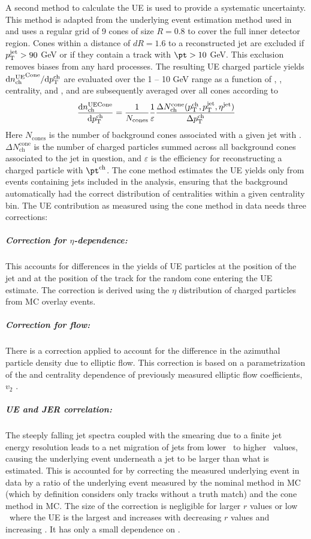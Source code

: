 A second method to calculate the UE is used to provide a systematic uncertainty. This method is adapted from the underlying event estimation method used in \cite{PhysRevC.98.024908} and uses a regular grid of 9 cones of size $R = 0.8$ to cover the full inner detector region. Cones within a distance of $dR=1.6$ to a reconstructed jet are excluded if $\mbox{$p_{\mathrm{T}}^{\mathrm{jet}}$} > 90$ GeV or if they contain a track with $\pt > 10$ GeV. This exclusion removes biases from any hard processes. The resulting UE charged particle yields $\mathrm{d} \mbox{$n_{\mathrm{ch}}^{\mathrm{UE}}$}^{\mathrm{Cone}}/ \mathrm{d} \mbox{$p_{{\mathrm{T}}}^{\mathrm{ch}}$}$ are evaluated over the 1 -- 10 GeV range as a function of \pt, \ptjet, centrality, and \rvar, and are subsequently averaged over all cones according to
 \begin{eqnarray}
 \label{eq:Dptsub}
\frac{\mathrm{d} n_{\mathrm{ch}}^{\mathrm{UE Cone}}}{\mathrm{d} \mbox{$p_{{\mathrm{T}}}^{\mathrm{ch}}$}}  = \frac{1}{N_{\mathrm{cones}}} \frac{1}{\varepsilon} \frac{\Delta N^{\mathrm{cone}}_{\mathrm{ch}} (\mbox{$p_{{\mathrm{T}}}^{\mathrm{ch}}$}, \mbox{$p_{\mathrm{T}}^{\mathrm{jet}}$}, \mbox{$\eta^{\mathrm{jet}}$})}{\Delta \mbox{$p_{{\mathrm{T}}}^{\mathrm{ch}}$}}
 \end{eqnarray}
 Here $N_{\mathrm{cones}}$ is the number of background cones associated with a given jet with \ptjet. $\Delta N^{\mathrm{cone}}_{\mathrm{ch}}$ is the number of charged particles summed across all background cones associated to the jet in question, and $\varepsilon$ is the efficiency for reconstructing a charged particle with $\pt^{\mathrm{ch}}$. The cone method estimates the UE yields only from events containing jets included in the analysis, ensuring that the background automatically had the correct distribution of centralities within a given centrality bin. The UE contribution as measured using the cone method in data needs three corrections:
 \subparagraph{Correction for $\eta$-dependence: } This accounts for differences in the yields of UE particles at the position of the jet and at the position of the track for the random cone entering the UE estimate. The correction is derived using the $\eta$ distribution of charged particles from MC overlay events.
 \subparagraph{Correction for flow: }  There is a correction applied to account for the difference in the azimuthal particle density due to elliptic flow. This correction is based on a parametrization of the \pTch and centrality dependence of previously measured elliptic flow coefficients, $v_{2}$ \cite{2019108}.  
\subparagraph{UE and JER correlation: } The steeply falling jet spectra coupled with the smearing due to a finite jet energy resolution leads to a net migration of jets from lower \pt\ to higher \pt\ values, causing the underlying event underneath a jet to be larger than what is estimated. This is accounted for by correcting the measured underlying event in data by a ratio of the underlying event measured by the nominal method in MC (which by definition considers only tracks without a truth match) and the cone method in MC. The size of the correction is negligible for larger $r$ values or low \pttrk\ where the UE is the largest and increases with decreasing $r$ values and increasing \pttrk. It has only a small dependence on \ptjet. 

